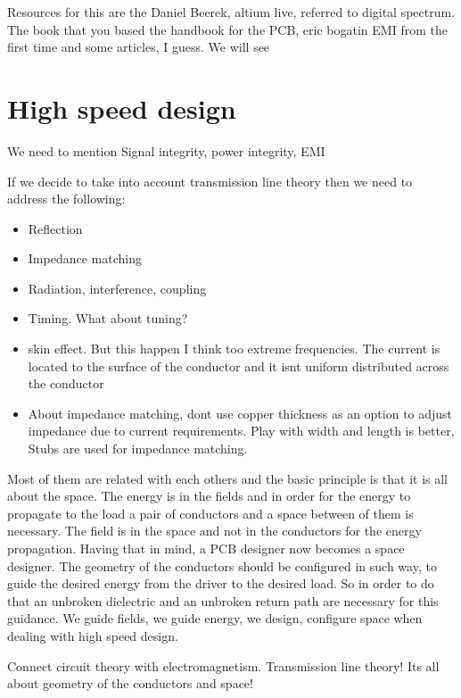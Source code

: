 \documentclass[12pt]{article}
\begin{document}
Resources for this are the Daniel Beerek, altium live, referred to digital spectrum. The book that you based the handbook for the PCB, eric bogatin EMI from the first time and some articles, I guess. We will see

\section{High speed design}

We need to mention Signal integrity, power integrity, EMI

If we decide to take into account transmission line theory then we need to address the following:
\begin{itemize}
		\item Reflection
		\item Impedance matching
		\item Radiation, interference, coupling
		\item Timing. What about tuning?
		\item skin effect. But this happen I think too extreme frequencies. The current is located to the surface of the conductor and it isnt uniform distributed across the conductor
		\item About impedance matching, dont use copper thickness as an option to adjust impedance due to current requirements. Play with width and length is better, Stubs are used for impedance matching.
\end{itemize}

Most of them are related with each others and the basic principle is that it is all about the space. The energy is in the fields and in order for the energy to propagate to the load  a pair of conductors and a space between of them is necessary. The field is in the space and not in the conductors for the energy propagation. Having that in mind, a PCB designer now becomes a space designer. The geometry of the conductors should be configured in such way, to guide the desired energy from the driver to the desired load. So in order to do that an unbroken dielectric and an unbroken return path are necessary for this guidance. We guide fields, we guide energy, we design, configure space when dealing with high speed design. 

Connect circuit theory with electromagnetism. Transmission line theory! Its all about geometry of the conductors and space!
\end{document}
